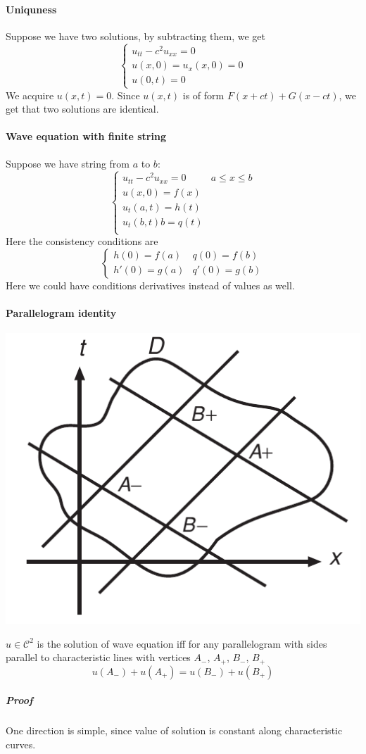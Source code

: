 \paragraph{Uniquness}
Suppose we have two solutions, by subtracting them, we get
$$\begin{cases}
u_{tt} -c^2u_{xx} = 0\\u(x,0) = u_x(x,0) = 0\\ u(0,t) = 0
\end{cases}$$
We acquire $u(x,t)=0$. Since $u(x,t)$ is of form $F(x+ct)+G(x-ct)$, we get that two solutions are identical.
\paragraph{Wave equation with finite string}
Suppose we have string from $a$ to $b$:
$$\begin{cases}
u_{tt} - c^2u_{xx} = 0 & a\leq x \leq b \\
u(x,0) = f(x) \\
u_t(a,t) = h(t)\\
u_t(b,t)b= q(t)\\
\end{cases}$$
Here the consistency conditions are
$$\begin{cases}
h(0) = f(a) & q(0) = f(b)\\
h'(0) = g(a) & q'(0) = g(b)
\end{cases}$$
Here we could have conditions derivatives instead of values as well.
\paragraph{Parallelogram identity}

\begin{center}
	\includegraphics[width=0.4\linewidth]{./lect4/pic1.png}
\end{center}
$u\in \mathcal{C}^2$ is the solution of wave equation iff for any parallelogram with sides parallel to characteristic lines with vertices $A_-$, $A_+$, $B_-$, $B_+$ 
$$u(A_-)+u(A_+) = u(B_-) + u(B_+)$$
\subparagraph{Proof}
One direction is simple, since value of solution is constant along characteristic curves.

